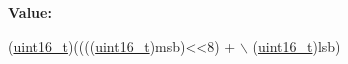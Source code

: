 {\bfseries Value\+:}
\begin{DoxyCode}
(\hyperlink{vl53l0x__types_8h_a273cf69d639a59973b6019625df33e30}{uint16\_t})((((\hyperlink{vl53l0x__types_8h_a273cf69d639a59973b6019625df33e30}{uint16\_t})msb)<<8) + \(\backslash\)
        (\hyperlink{vl53l0x__types_8h_a273cf69d639a59973b6019625df33e30}{uint16\_t})lsb)
\end{DoxyCode}
